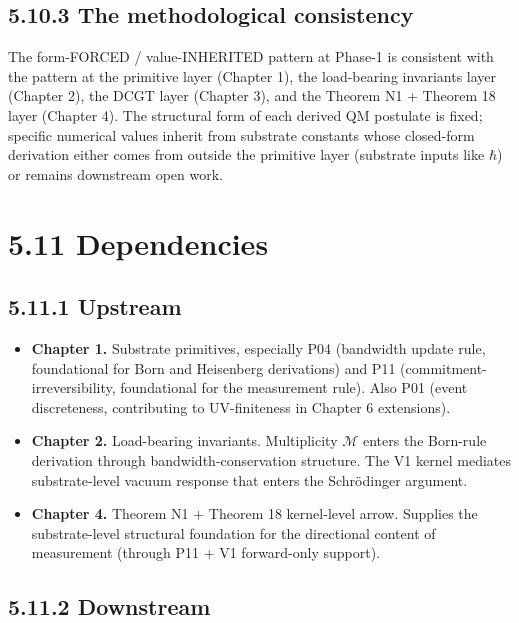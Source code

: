 \documentclass[11pt]{book}
\begin{document}
\subsection{5.10.3 The methodological consistency}

The form-FORCED / value-INHERITED pattern at Phase-1 is consistent with the pattern at the primitive layer (Chapter 1), the load-bearing invariants layer (Chapter 2), the DCGT layer (Chapter 3), and the Theorem N1 + Theorem 18 layer (Chapter 4). The structural form of each derived QM postulate is fixed; specific numerical values inherit from substrate constants whose closed-form derivation either comes from outside the primitive layer (substrate inputs like $\hbar$) or remains downstream open work.

\section{5.11 Dependencies}

\subsection{5.11.1 Upstream}

\begin{itemize}
\item \textbf{Chapter 1.} Substrate primitives, especially P04 (bandwidth update rule, foundational for Born and Heisenberg derivations) and P11 (commitment-irreversibility, foundational for the measurement rule). Also P01 (event discreteness, contributing to UV-finiteness in Chapter 6 extensions).
\item \textbf{Chapter 2.} Load-bearing invariants. Multiplicity $\mathcal{M}$ enters the Born-rule derivation through bandwidth-conservation structure. The V1 kernel mediates substrate-level vacuum response that enters the Schrödinger argument.
\item \textbf{Chapter 4.} Theorem N1 + Theorem 18 kernel-level arrow. Supplies the substrate-level structural foundation for the directional content of measurement (through P11 + V1 forward-only support).
\end{itemize}

\subsection{5.11.2 Downstream}
\end{document}
